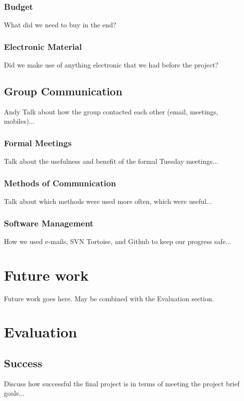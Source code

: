 \documentclass[oneside]{ecsgdp}         %
\begin{document}
\subsection{Budget}
What did we need to buy in the end?

\subsection{Electronic Material}
Did we make use of anything electronic that we had before the project?

\section{Group Communication}
Andy
Talk about how the group contacted each other (email, meetings, mobiles)...

\subsection{Formal Meetings}
Talk about the usefulness and benefit of the formal Tuesday meetings...

\subsection{Methods of Communication}
Talk about which methods were used more often, which were useful...

\subsection{Software Management}
How we used e-mails, SVN Tortoise, and Github to keep our progress safe...


\chapter{Future work}
Future work goes here. May be combined with the Evaluation section.

\chapter{Evaluation}

\section{Success}
Discuss how successful the final project is in terms of meeting the project brief goals...
\end{document}
